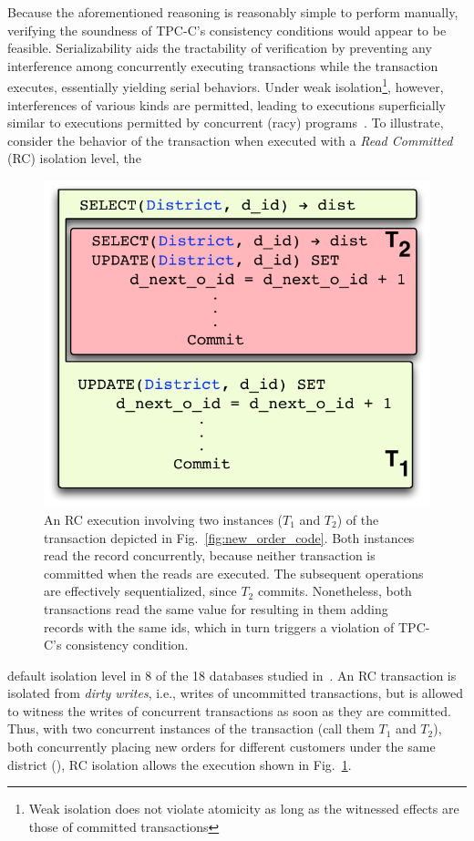 Because the aforementioned reasoning is reasonably simple to perform
manually, verifying the soundness of TPC-C's consistency conditions
would appear to be feasible.  Serializability aids the tractability of
verification by preventing any interference among concurrently
executing transactions while the  transaction executes,
essentially yielding serial behaviors.  Under weak
isolation\footnote{Weak isolation does not violate atomicity as long
  as the witnessed effects are those of committed transactions},
however, interferences of various kinds are permitted, leading to
executions superficially similar to executions permitted by concurrent
(racy) programs~\cite{GHE15,HPQ+15}.  To illustrate, consider the
behavior of the  transaction
when executed with a \emph{Read Committed} (RC) isolation level, the
\begin{figure}
\includegraphics[scale=0.45]{Figures/motiv-eg-1-b}
\caption{\small An RC execution involving two instances ($T_1$ and
  $T_2$) of the  transaction depicted in
  Fig.~\ref{fig:new_order_code}. 
  Both instances read the   record concurrently,
  because neither transaction is committed when the reads are
  executed.  The subsequent operations are effectively sequentialized,
  since $T_2$ commits. Nonetheless, both transactions read the same value for
   resulting in them  adding  records
  with the same ids, which in turn triggers a violation of TPC-C's
  consistency condition.}
\label{fig:new_order_exec}
\end{figure}
default isolation level in 8 of the 18 databases studied
in~\cite{bailishotos}.  An RC transaction is isolated from \emph{dirty
  writes}, i.e., writes of uncommitted transactions, but is allowed to
witness the writes of concurrent transactions as soon as they are
committed. Thus, with two concurrent instances of the 
transaction (call them $T_1$ and $T_2$), both concurrently placing new
orders for different customers under the same district (), RC
isolation allows the execution shown in Fig.~\ref{fig:new_order_exec}.


